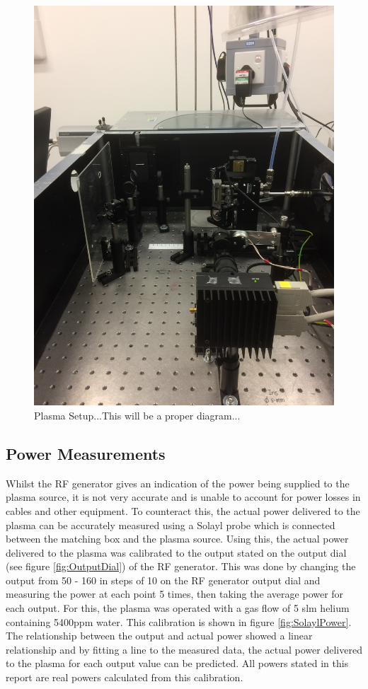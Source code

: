 \documentclass[11pt, oneside]{article}   	%
\begin{document}
\begin{figure}
    \centering
    \includegraphics[width=\textwidth]{Figures/PlasmaSetup.JPG}
    \caption{Plasma Setup...This will be a proper diagram...}
    \label{fig:my_label}
\end{figure}


\subsection{Power Measurements}

Whilst the RF generator gives an indication of the power being supplied to the plasma source, it is not very accurate and is unable to account for power losses in cables and other equipment.
To counteract this, the actual power delivered to the plasma can be accurately measured using a Solayl probe which is connected between the matching box and the plasma source.
Using this, the actual power delivered to the plasma was calibrated to the output stated on the output dial (see figure \ref{fig:OutputDial}) of the RF generator. 
This was done by changing the output from 50 - 160 in steps of 10 on the RF generator output dial and measuring the power at each point 5 times, then taking the average power for each output.
For this, the plasma was operated with a gas flow of 5 slm helium containing 5400ppm water.
This calibration is shown in figure \ref{fig:SolaylPower}.
The relationship between the output and actual power showed a linear relationship and by fitting a line to the measured data, the actual power delivered to the plasma for each output value can be predicted. 
All powers stated in this report are real powers calculated from this calibration.
\end{document}

